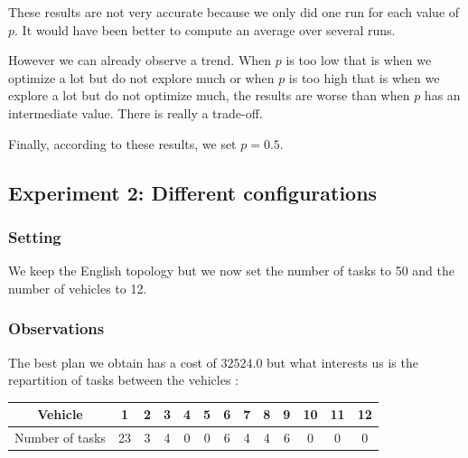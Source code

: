 \documentclass[11pt]{article}
\begin{document}
These results are not very accurate because we only did one run for each value of $p$. It would have been better to compute an average over several runs. 

However we can already observe a trend. When $p$ is too low that is when we optimize a lot but do not explore much or when $p$ is too high that is when we explore a lot but do not optimize much, the results are worse than when $p$ has an intermediate value. There is really a trade-off.

Finally, according to these results, we set $p = 0.5$.

\subsection{Experiment 2: Different configurations}

\subsubsection{Setting}

We keep the English topology but we now set the number of tasks to 50 and the number of vehicles to 12.

\subsubsection{Observations}

The best plan we obtain has a cost of $32524.0$ but what interests us is the repartition of tasks between the vehicles :

\begin{table}[h!]
\centering
\begin{scriptsize}
\begin{tabular}{|c|c|c|c|c|c|c|c|c|c|c|c|c|}
\hline
Vehicle & 1 & 2 & 3 & 4 & 5 & 6 & 7 & 8 & 9 & 10 & 11 & 12 \\
\hline
Number of tasks & 23 & 3 & 4 & 0 & 0 & 6 & 4 & 4 & 6 & 0 & 0 & 0 \\
\hline
\end{tabular}
\end{scriptsize}
\end{table}
\end{document}

